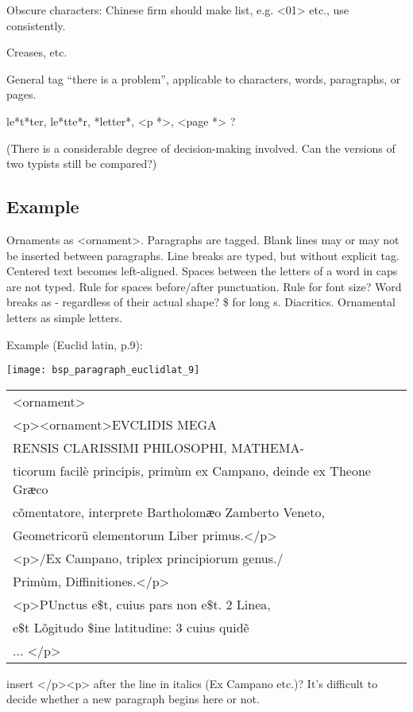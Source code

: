 Obscure characters: Chinese firm should make list, e.g. <01> etc., use consistently.

Creases, etc.

General tag “there is a problem”, applicable to characters, words, paragraphs, or pages. 

le*t*ter, le*tte*r, *letter*, <p *>, <page *> ? 

(There is a considerable degree of decision-making involved. Can the versions of two typists still be compared?)


\subsection{Example}
\label{Structural markup general example}

Ornaments as <ornament>. Paragraphs are tagged. Blank lines may or may not be inserted between paragraphs. Line breaks are typed, but without explicit tag. Centered text becomes left-aligned. Spaces between the letters of a word in caps are not typed. Rule for spaces before/after punctuation. Rule for font size? Word breaks as - regardless of their actual shape? \$ for long s. Diacritics. Ornamental letters as simple letters. 

Example (Euclid latin, p.9):

\texttt{[image: bsp\_paragraph\_euclidlat\_9]} 


\begin{tabular}{l}
<ornament> \\
<p><ornament>EVCLIDIS MEGA \\
RENSIS CLARISSIMI PHILOSOPHI, MATHEMA- \\
ticorum facilè principis, primùm ex Campano, deinde ex Theone Grӕco \\
cõmentatore, interprete Bartholomӕo Zamberto Veneto, \\
Geometricorũ elementorum Liber primus.</p> \\
<p>/Ex Campano, triplex principiorum genus./  \\
Primùm, Diffinitiones.</p> \\
<p>PUnctus e\$t, cuius pars non e\$t. 2 Linea, \\
e\$t Lõgitudo \$ine latitudine: 3 cuius quidẽ \\
... </p> \\
\end{tabular}

insert </p><p> after the line in italics (Ex Campano etc.)? It's difficult to decide whether a new paragraph begins here or not.

